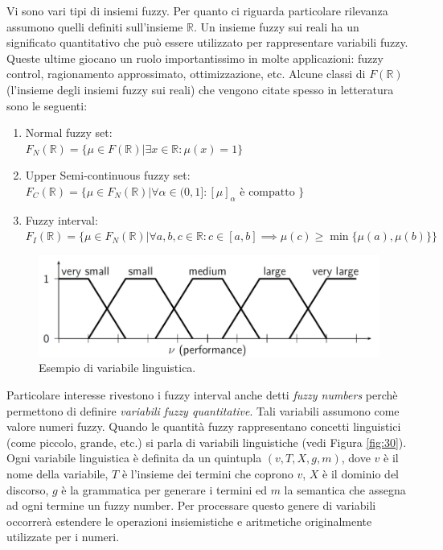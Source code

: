 \documentclass[10pt,a4paper]{article}
\begin{document}
Vi sono vari tipi di insiemi fuzzy. Per quanto ci riguarda particolare rilevanza assumono quelli definiti sull'insieme $\mathbb{R}$. Un insieme fuzzy sui reali ha un significato quantitativo che può essere utilizzato per rappresentare variabili fuzzy. Queste ultime giocano un ruolo importantissimo in molte applicazioni: fuzzy control, ragionamento approssimato, ottimizzazione, etc. Alcune classi di $F(\mathbb{R})$ (l'insieme degli insiemi fuzzy sui reali) che vengono citate spesso in letteratura sono le seguenti:
\begin{enumerate}
\item{Normal fuzzy set: \\ $F_N(\mathbb{R}) = \{\mu \in F(\mathbb{R}) | \exists x \in \mathbb{R} : \mu(x) = 1 \}$}
\item{Upper Semi-continuous fuzzy set: \\$F_C(\mathbb{R}) = \{\mu \in F_N(\mathbb{R}) | \forall \alpha \in (0,1] : [\mu]_\alpha \text{ è compatto }\}$}
\item{Fuzzy interval: \\ $F_I(\mathbb{R}) = \{\mu \in F_N(\mathbb{R}) | \forall a,b,c \in \mathbb{R} : c \in [a,b] \implies \mu(c) \geq \min\{ \mu(a),\mu(b) \} \}$}
\end{enumerate}

\begin{figure}
\centering
\includegraphics[scale=0.3]{img/lingvar.png}
\caption{Esempio di variabile linguistica.}
\label{fig:29}
\end{figure}

Particolare interesse rivestono i fuzzy interval anche detti \emph{fuzzy numbers} perchè permettono di definire \emph{variabili fuzzy quantitative}. Tali variabili assumono come valore numeri fuzzy. Quando le quantità fuzzy rappresentano concetti linguistici (come piccolo, grande, etc.) si parla di variabili linguistiche (vedi Figura \ref{fig:30}). Ogni variabile linguistica è definita da un quintupla $(v,T,X,g,m)$, dove $v$ è il nome della variabile, $T$ è l'insieme dei termini che coprono $v$, $X$ è il dominio del discorso, $g$ è la grammatica per generare i termini ed $m$ la semantica che assegna ad ogni termine un fuzzy number. Per processare questo genere di variabili occorrerà estendere le operazioni insiemistiche e aritmetiche originalmente utilizzate per i numeri. 
\end{document}
